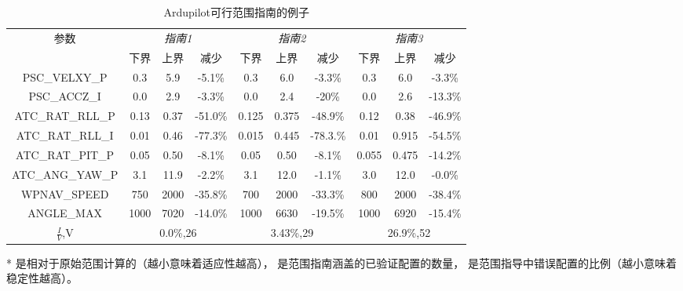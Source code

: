 \begin{table}[ht]
\caption{Ardupilot可行范围指南的例子}
\label{tab:range_shrink_cmp}
\centering
\begin{threeparttable}
\begin{tabular}{c|ccc|ccc|ccc}
        \toprule[1.5pt]
          \multirow{2}{*}{参数}  & \multicolumn{3}{c|}{\textit{指南1}} & \multicolumn{3}{c|}{\textit{指南2}} & \multicolumn{3}{c}{\textit{指南3}} \\
         \cmidrule[0.8pt]{2-10}
          ~ & {下界} & 上界 & 减少& {下界} & {上界} & 减少& {下界} & {上界} & 减少 \\
         
         \midrule[0.8pt]
        
        
          PSC\_VELXY\_P  &  0.3 &  5.9   & -5.1\%&  0.3 & 6.0  & -3.3\%  & 0.3 & 6.0   & -3.3\%\\
        
          PSC\_ACCZ\_I  &  0.0 &  2.9   & -3.3\%&  0.0 & 2.4  & -20\%  & 0.0 & 2.6  & -13.3\%\\
        
          ATC\_RAT\_RLL\_P &   0.13 &  0.37   & -51.0\%&  0.125 & 0.375  & -48.9\%  & 0.12 & 0.38  & -46.9\%\\
        
          ATC\_RAT\_RLL\_I &   0.01 &  0.46   & -77.3\%&  0.015 & 0.445  & -78.3.\%  & 0.01 & 0.915  & -54.5\%\\
        
          ATC\_RAT\_PIT\_P &   0.05 &  0.50   & -8.1\%&  0.05 & 0.50  & -8.1\%  & 0.055 & 0.475  & -14.2\%\\
    
          ATC\_ANG\_YAW\_P &   3.1 &  11.9   & -2.2\%&  3.1 & 12.0  & -1.1\%  & 3.0 & 12.0 & -0.0\%\\
        
          WPNAV\_SPEED &   750 &  2000   & -35.8\%&  700 & 2000  & -33.3\%  & 800 & 2000  & -38.4\%\\
         
          ANGLE\_MAX &   1000 &  7020   & -14.0\%&  1000 & 6630  & -19.5\%  & 1000 & 6920 & -15.4\%\\
        \midrule[0.8pt]
        {$\frac{I}{V}$},{V} & 
        \multicolumn{3}{c|}{0.0\%,26} & 
        \multicolumn{3}{c|}{3.43\%,29} &
         \multicolumn{3}{c}{26.9\%,52} \\
        \bottomrule[1.5pt]
        
\end{tabular}
\begin{tablenotes}
\footnotesize
\item[*] 
是相对于原始范围计算的（越小意味着适应性越高），
 是范围指南涵盖的已验证配置的数量，
 是范围指导中错误配置的比例（越小意味着稳定性越高）。
\end{tablenotes}
\end{threeparttable}
\end{table}


